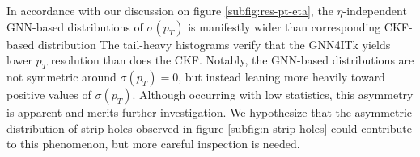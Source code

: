 \newpage
In accordance with our discussion on figure \ref{subfig:res-pt-eta}, the $\eta$-independent GNN-based distributions of $\sigma(p_T)$ is manifestly wider than corresponding CKF-based distribution
The tail-heavy histograms verify that the GNN4ITk yields lower $p_T$ resolution than does the CKF. 
Notably, the GNN-based distributions are not symmetric around $\sigma(p_T)=0$, but instead leaning more heavily toward positive values of $\sigma(p_T)$. 
Although occurring with low statistics, this asymmetry is apparent and merits further investigation.
We hypothesize that the asymmetric distribution of strip holes observed in figure \ref{subfig:n-strip-holes} could contribute to this phenomenon, but more careful inspection is needed.



